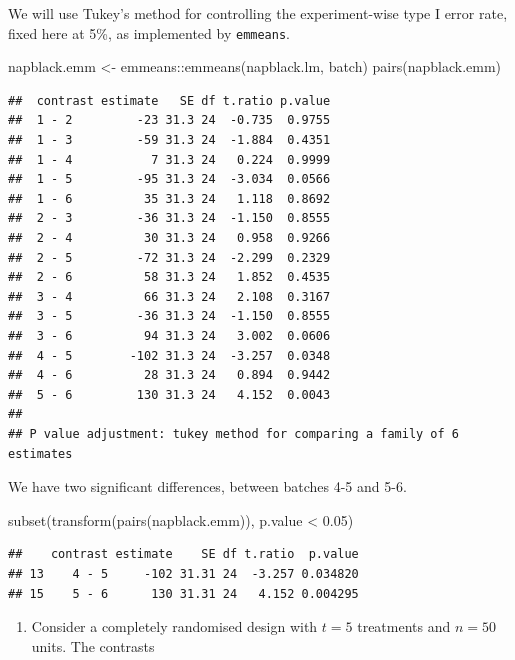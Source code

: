 \documentclass[
]{book}
\newenvironment{Shaded}{\begin{snugshade}}{\end{snugshade}}
\newcommand{\FloatTok}[1]{\textcolor[rgb]{0.00,0.00,0.81}{#1}}
\newcommand{\FunctionTok}[1]{\textcolor[rgb]{0.00,0.00,0.00}{#1}}
\newcommand{\NormalTok}[1]{#1}
\newcommand{\OtherTok}[1]{\textcolor[rgb]{0.56,0.35,0.01}{#1}}
\newcommand{\SpecialCharTok}[1]{\textcolor[rgb]{0.00,0.00,0.00}{#1}}
\newcommand{\StringTok}[1]{\textcolor[rgb]{0.31,0.60,0.02}{#1}}
\providecommand{\tightlist}{%
  \setlength{\itemsep}{0pt}\setlength{\parskip}{0pt}}
\theoremstyle{definition}
\theoremstyle{definition}
\theoremstyle{definition}
\theoremstyle{definition}
\theoremstyle{remark}
\begin{document}
\begin{enumerate}
  We will use Tukey's method for controlling the experiment-wise type I error rate, fixed here at 5\%, as implemented by \texttt{emmeans}.

\begin{Shaded}
\begin{Highlighting}[]
\NormalTok{napblack.emm }\OtherTok{\textless{}{-}}\NormalTok{ emmeans}\SpecialCharTok{::}\FunctionTok{emmeans}\NormalTok{(napblack.lm, }\StringTok{\textquotesingle{}batch\textquotesingle{}}\NormalTok{)}
\FunctionTok{pairs}\NormalTok{(napblack.emm)}
\end{Highlighting}
\end{Shaded}

\begin{verbatim}
##  contrast estimate   SE df t.ratio p.value
##  1 - 2         -23 31.3 24  -0.735  0.9755
##  1 - 3         -59 31.3 24  -1.884  0.4351
##  1 - 4           7 31.3 24   0.224  0.9999
##  1 - 5         -95 31.3 24  -3.034  0.0566
##  1 - 6          35 31.3 24   1.118  0.8692
##  2 - 3         -36 31.3 24  -1.150  0.8555
##  2 - 4          30 31.3 24   0.958  0.9266
##  2 - 5         -72 31.3 24  -2.299  0.2329
##  2 - 6          58 31.3 24   1.852  0.4535
##  3 - 4          66 31.3 24   2.108  0.3167
##  3 - 5         -36 31.3 24  -1.150  0.8555
##  3 - 6          94 31.3 24   3.002  0.0606
##  4 - 5        -102 31.3 24  -3.257  0.0348
##  4 - 6          28 31.3 24   0.894  0.9442
##  5 - 6         130 31.3 24   4.152  0.0043
## 
## P value adjustment: tukey method for comparing a family of 6 estimates
\end{verbatim}

  We have two significant differences, between batches 4-5 and 5-6.

\begin{Shaded}
\begin{Highlighting}[]
\FunctionTok{subset}\NormalTok{(}\FunctionTok{transform}\NormalTok{(}\FunctionTok{pairs}\NormalTok{(napblack.emm)), p.value }\SpecialCharTok{\textless{}} \FloatTok{0.05}\NormalTok{)}
\end{Highlighting}
\end{Shaded}

\begin{verbatim}
##    contrast estimate    SE df t.ratio  p.value
## 13    4 - 5     -102 31.31 24  -3.257 0.034820
## 15    5 - 6      130 31.31 24   4.152 0.004295
\end{verbatim}
\end{enumerate}

\begin{enumerate}
\def\labelenumi{\arabic{enumi}.}
\setcounter{enumi}{3}
\tightlist
\item
  \citep[Adapted from][]{Morris2011} Consider a completely randomised design with \(t = 5\) treatments and \(n=50\) units. The contrasts
\end{enumerate}
\end{document}
